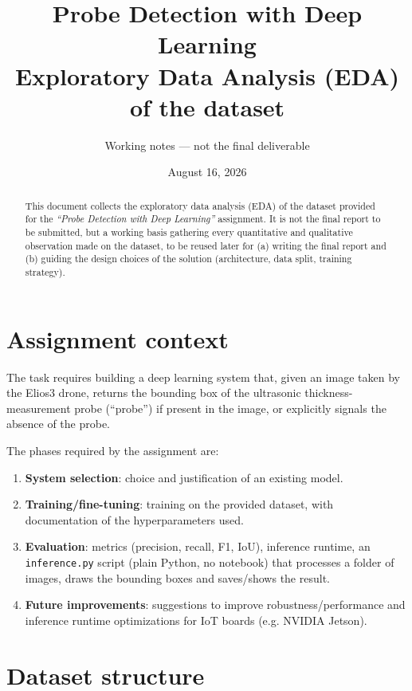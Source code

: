 \documentclass[11pt,a4paper]{article}
\title{\textbf{Probe Detection with Deep Learning} \\ \large Exploratory Data Analysis (EDA) of the dataset}
\author{Working notes --- not the final deliverable}
\date{August 16, 2026}
\begin{document}
\maketitle

\begin{abstract}
\noindent
This document collects the exploratory data analysis (EDA) of the dataset provided for the
\emph{``Probe Detection with Deep Learning''} assignment. It is not the final report to be
submitted, but a working basis gathering every quantitative and qualitative observation made on
the dataset, to be reused later for (a) writing the final report and (b) guiding the design
choices of the solution (architecture, data split, training strategy).
\end{abstract}

\tableofcontents

\section{Assignment context}

The task requires building a deep learning system that, given an image taken by the Elios3
drone, returns the bounding box of the ultrasonic thickness-measurement probe (``probe'') if
present in the image, or explicitly signals the absence of the probe.

The phases required by the assignment are:
\begin{enumerate}[nosep]
    \item \textbf{System selection}: choice and justification of an existing model.
    \item \textbf{Training/fine-tuning}: training on the provided dataset, with documentation of
          the hyperparameters used.
    \item \textbf{Evaluation}: metrics (precision, recall, F1, IoU), inference runtime, an
          \texttt{inference.py} script (plain Python, no notebook) that processes a folder of
          images, draws the bounding boxes and saves/shows the result.
    \item \textbf{Future improvements}: suggestions to improve robustness/performance and
          inference runtime optimizations for IoT boards (e.g. NVIDIA Jetson).
\end{enumerate}

\section{Dataset structure}
\end{document}
